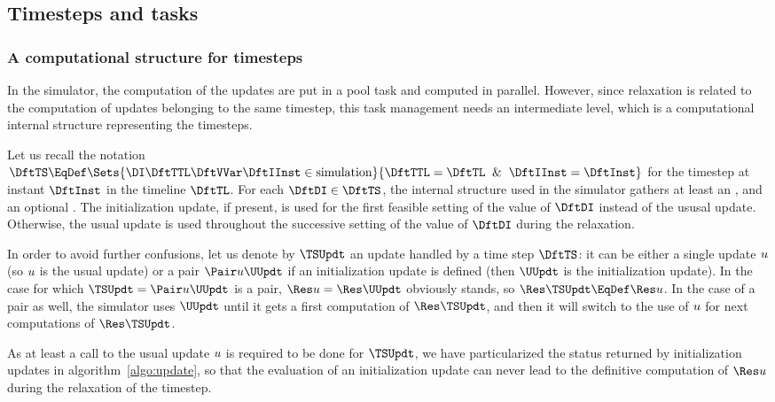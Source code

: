 \subsection{Timesteps and tasks}

\subsubsection{A computational structure for timesteps}

In the simulator, the computation of the updates are put in a pool task and computed in parallel. However, since relaxation is related to the computation of updates belonging to the same timestep, this task management needs an intermediate level, which is a computational internal structure representing the timesteps.

Let us recall the notation $\DftTS \EqDef \Sets{\DI\DftTTL\DftVVar\DftIInst \in \mbox{simulation}}{\DftTTL = \DftTL \And \DftIInst=\DftInst}$ for the timestep at instant $\DftInst$ in the timeline $\DftTL$. For each $\DftDI \in \DftTS$, the internal structure used in the simulator gathers at least an , and an optional . The initialization update, if present, is used for the first feasible setting of the value of $\DftDI$ instead of the ususal update. Otherwise, the usual update is used throughout the successive setting of the value of $\DftDI$ during the relaxation.

In order to avoid further confusions, let us denote by $\TSUpdt$ an update handled by a time step $\DftTS$: it can be either a single update $u$ (so $u$ is the usual update) or a pair $\Pair\cxDftUpdt\UUpdt$ if an initialization update is defined (then $\UUpdt$ is the initialization update). In the case for which $\TSUpdt = \Pair\cxDftUpdt\UUpdt$ is a pair, $\Res\cxDftUpdt = \Res\UUpdt$ obviously stands, so $\Res\TSUpdt \EqDef \Res\cxDftUpdt$. In the case of a pair as well, the simulator uses $\UUpdt$ until it gets a first computation of $\Res\TSUpdt$, and then it will switch to the use of $u$ for next computations of $\Res\TSUpdt$.

As at least a call to the usual update $u$ is required to be done for $\TSUpdt$, we have particularized the status returned by initialization updates in algorithm~\ref{algo:update}, so that the evaluation of an initialization update can never lead to the definitive computation of $\Res\cxDftUpdt$ during the relaxation of the timestep.

